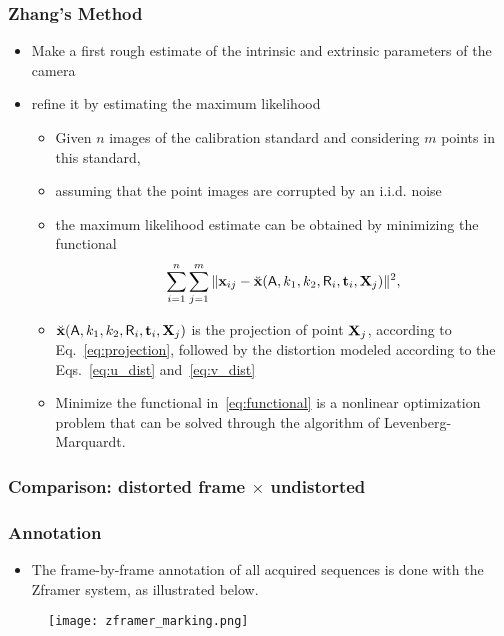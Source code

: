 \documentclass{beamer}
\begin{document}
		\begin{frame}
			\frametitle{Zhang's Method}
			\begin{itemize}
			 \item Make a first rough estimate of the intrinsic and extrinsic parameters of the camera
			 \item refine it by estimating the maximum likelihood
			 \begin{itemize}
			  \item Given $ n $ images of the calibration standard and considering $ m $ points in this standard,
			  \item assuming that the point images are corrupted by an i.i.d. noise
			  \item the maximum likelihood estimate can be obtained by minimizing the functional
			  \begin{equation}
			    \sum_{i=1}^{n}\sum_{j=1}^{m} \Vert \mathbf{x}_{ij} - \breve{\mathbf{x}}(\mathsf{A}, k_1, k_2, \mathsf{R}_i, \mathbf{t}_i, \mathbf{X}_j) \Vert^2
			    \label{eq:functional},
			  \end{equation}
			  \item $\breve{\mathbf{x}}(\mathsf{A}, k_1, k_2, \mathsf{R}_i, \mathbf{t}_i, \mathbf{X}_j)$ is the projection of point $\mathbf{X}_j$, according to Eq.~\eqref{eq:projection},
			followed by the distortion modeled according to the Eqs.~\eqref{eq:u_dist} and~\eqref{eq:v_dist}
			  \item Minimize the functional in~\eqref{eq:functional} is a nonlinear optimization problem that can be solved through the algorithm of Levenberg-Marquardt.
			 \end{itemize}
			\end{itemize}
		\end{frame}


		\begin{frame}\frametitle{Comparison: distorted frame $\times$ undistorted}
			\begin{figure}[htb!]
				\center
				\label{fig:undistort}
			\end{figure}
		\end{frame}


		\begin{frame}\frametitle{Annotation}
			\begin{itemize}
				\item The frame-by-frame annotation of all acquired sequences is done with the Zframer system, as illustrated below.
			\end{itemize}
			\begin{figure}[htb]
				\centering
				\texttt{[image: zframer\_marking.png]}
				\label{fig:zframer1}
			\end{figure}
		\end{frame}
\end{document}
